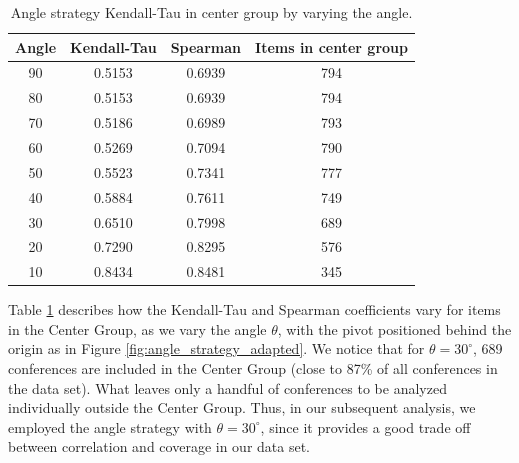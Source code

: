 \documentclass[notitlepage]{svjour3}
\begin{document}
\begin{table}[ht!]
\centering
 \begin{tabular}{c c c c} 
 \toprule
 Angle & Kendall-Tau & Spearman & Items in center group \\ 
 \midrule
 90 & 0.5153 & 0.6939 & 794 \\ 
 80 & 0.5153 & 0.6939 & 794 \\
 70 & 0.5186 & 0.6989 & 793 \\
 60 & 0.5269 & 0.7094 & 790 \\
 50 & 0.5523 & 0.7341 & 777 \\
 40 & 0.5884 & 0.7611 & 749 \\
 30 & 0.6510 & 0.7998 & 689 \\
 20 & 0.7290 & 0.8295 & 576 \\
 10 & 0.8434 & 0.8481 & 345 \\
 \bottomrule
 \end{tabular}
 \caption{Angle strategy Kendall-Tau in center group by varying the angle.}
 \label{tab:angle_strategy}
\end{table}

Table \ref{tab:angle_strategy} describes how the Kendall-Tau and Spearman coefficients vary for items 
in the Center Group, as we vary the angle $ \theta $, with the pivot positioned behind 
the origin as in Figure \ref{fig:angle_strategy_adapted}. We notice that for $ \theta = 30^{\circ} $, 
689 conferences are included in the Center
Group (close to 87\% of all conferences in the data set). What leaves only a handful of conferences to
be analyzed individually outside the Center Group.
Thus, in our subsequent 
analysis, we employed the angle strategy with $ \theta = 30^{\circ} $, since it provides 
a good trade off between correlation and coverage in our data set.
\end{document}
